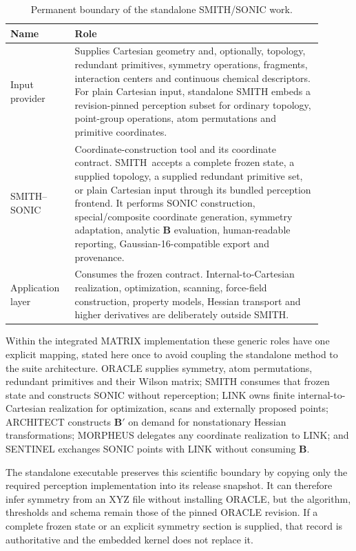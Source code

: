 \documentclass[journal=jctcce,manuscript=article,layout=traditional]{achemso}
\newcommand{\SONIC}{SONIC}
\newcommand{\SMITH}{\textsc{SMITH}}
\newcommand{\Bmat}{\mathbf{B}}
\theoremstyle{definition}
\begin{document}
\begin{table}[htbp]
\centering
\caption{Permanent boundary of the standalone SMITH/SONIC work.}
\label{tab:framework-roles}
\begin{tabular}{@{}p{0.18\linewidth}p{0.72\linewidth}@{}}
\toprule
Name & Role \\
\midrule
Input provider & Supplies Cartesian geometry and, optionally, topology,
redundant primitives, symmetry operations, fragments, interaction centers and
continuous chemical descriptors.  For plain Cartesian input, standalone SMITH
embeds a revision-pinned perception subset for ordinary topology, point-group
operations, atom permutations and primitive coordinates. \\
\SMITH{}--\SONIC & Coordinate-construction tool and its coordinate
contract.  \SMITH\ accepts a complete frozen state, a supplied topology, a
supplied redundant primitive set, or plain Cartesian input through its bundled
perception frontend.  It performs SONIC construction, special/composite coordinate
generation, symmetry adaptation, analytic \(\Bmat\) evaluation, human-readable
reporting, Gaussian-16-compatible export and provenance. \\
Application layer & Consumes the frozen contract.  Internal-to-Cartesian
realization, optimization, scanning, force-field construction, property
models, Hessian transport and higher derivatives are deliberately outside
SMITH. \\
\bottomrule
\end{tabular}
\end{table}

Within the integrated MATRIX implementation these generic roles have one
explicit mapping, stated here once to avoid coupling the standalone method to
the suite architecture. ORACLE supplies symmetry, atom permutations, redundant
primitives and their Wilson matrix; SMITH consumes that frozen state and
constructs SONIC without reperception; LINK owns finite internal-to-Cartesian
realization for optimization, scans and externally proposed points; ARCHITECT
constructs $\Bmat'$ on demand for nonstationary Hessian transformations;
MORPHEUS delegates any coordinate realization to LINK; and SENTINEL exchanges
SONIC points with LINK without consuming $\Bmat$.

The standalone executable preserves this scientific boundary by copying only
the required perception implementation into its release snapshot.  It can
therefore infer symmetry from an XYZ file without installing ORACLE, but the
algorithm, thresholds and schema remain those of the pinned ORACLE revision.
If a complete frozen state or an explicit symmetry section is supplied, that
record is authoritative and the embedded kernel does not replace it.
\end{document}
